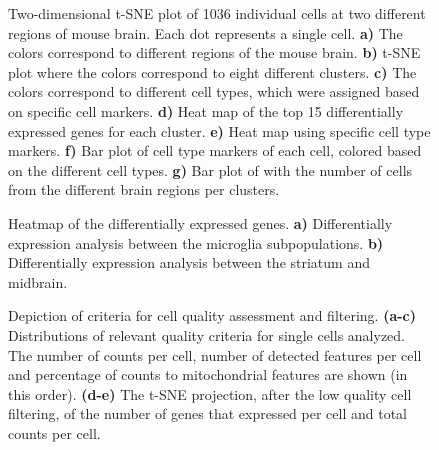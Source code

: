 \documentclass[]{article}
\begin{document}
\begin{figure}[]
	\caption{ Two-dimensional t-SNE plot of 1036 individual cells at two different regions of mouse brain. Each dot represents a single cell. \textbf{a)} The colors correspond to different regions of the mouse brain. \textbf{b)} t-SNE plot where the colors correspond to eight different clusters. \textbf{c)} The colors correspond to different cell types, which were assigned based on specific cell markers. \textbf{d)} Heat map of the top 15 differentially expressed genes for each cluster. \textbf{e)} Heat map using specific cell type markers. \textbf{f)} Bar plot of cell type markers of each cell, colored based on the different cell types. \textbf{g)} Bar plot of with the number of cells from the different brain regions per clusters.}
	\label{fig:1}
\end{figure}

\begin{figure}[]
	\caption{ Heatmap of the differentially expressed genes. \textbf{a)} Differentially expression analysis between the microglia subpopulations. \textbf{b)} Differentially expression analysis between the striatum and midbrain.}
	\label{fig:2}
\end{figure}




\begin{figure}[]
	\caption{ Depiction of criteria for cell quality assessment and filtering.  \textbf{(a-c)} Distributions of relevant quality criteria for single cells analyzed. The number of counts per cell, number of detected features per cell and percentage of counts to mitochondrial features are shown (in this order). \textbf{(d-e)}  The t-SNE projection, after the low quality cell filtering, of the number of genes that expressed per cell and total counts per cell. }
	\label{fig:3}
\end{figure}
\end{document}
